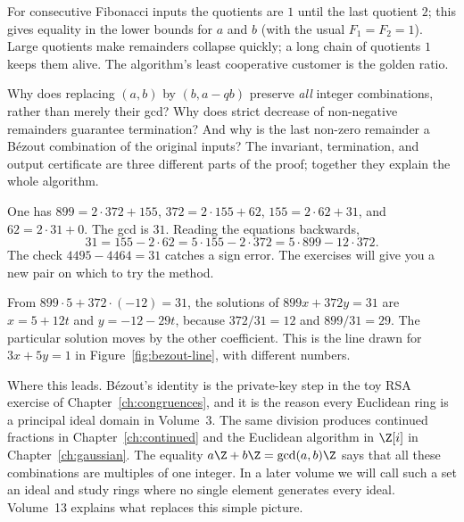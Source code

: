 For consecutive Fibonacci inputs the quotients are $1$ until the last quotient $2$; this gives equality in the lower bounds for $a$ and $b$ (with the usual $F_1=F_2=1$). Large quotients make remainders collapse quickly; a long chain of quotients $1$ keeps them alive. The algorithm's least cooperative customer is the golden ratio.

\begin{reminder}
Why does replacing $(a,b)$ by $(b,a-qb)$ preserve \emph{all} integer combinations, rather than merely their gcd? Why does strict decrease of non-negative remainders guarantee termination? And why is the last non-zero remainder a B\'ezout combination of the original inputs? The invariant, termination, and output certificate are three different parts of the proof; together they explain the whole algorithm.
\end{reminder}

\begin{examplex}
One has $899=2\cdot372+155$, $372=2\cdot155+62$, $155=2\cdot62+31$, and $62=2\cdot31+0$. The gcd is $31$. Reading the equations backwards,
\[
31=155-2\cdot62
=5\cdot155-2\cdot372
=5\cdot899-12\cdot372.
\]
The check $4495-4464=31$ catches a sign error. The exercises will give you a new pair on which to try the method.
\end{examplex}

\begin{examplex}
From $899\cdot5+372\cdot(-12)=31$, the solutions of $899x+372y=31$ are $x=5+12t$ and $y=-12-29t$, because $372/31=12$ and $899/31=29$. The particular solution moves by the other coefficient. This is the line drawn for $3x+5y=1$ in Figure~\ref{fig:bezout-line}, with different numbers.
\end{examplex}

\begin{beauty}
Where this leads. Bézout's identity is the private-key step in the toy RSA exercise of Chapter~\ref{ch:congruences}, and it is the reason every Euclidean ring is a principal ideal domain in Volume~3. The same division produces continued fractions in Chapter~\ref{ch:continued} and the Euclidean algorithm in $\Z[i]$ in Chapter~\ref{ch:gaussian}. The equality $a\Z+b\Z=\gcd(a,b)\Z$ says that all these combinations are multiples of one integer. In a later volume we will call such a set an ideal and study rings where no single element generates every ideal. Volume~13 explains what replaces this simple picture.
\end{beauty}

